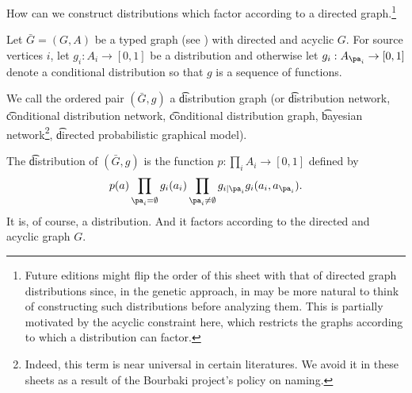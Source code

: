 

How can we construct distributions which factor according to a directed graph.\footnote{Future editions might flip the order of this sheet with that of directed graph distributions since, in the genetic approach, in may be more natural to think of constructing such distributions before analyzing them. This is partially motivated by the acyclic constraint here, which restricts the graphs according to which a distribution can factor.}


Let $\bar{G} = (G, A)$ be a typed graph (see ) with directed and acyclic $G$.
For source vertices $i$, let $g_i: A_i \to [0, 1]$ be a distribution and otherwise let $g_{i}: A_{\pa_i} \to [0, 1]$ denote a conditional distribution so that $g$ is a sequence of functions.

We call the ordered pair $(\bar{G}, g)$ a \t{distribution graph} (or \t{distribution network}, \t{conditional distribution network}, \t{conditional distribution graph}, \t{bayesian network}\footnote{Indeed, this term is near universal in certain literatures. We avoid it in these sheets as a result of the Bourbaki project's policy on naming.}, \t{directed probabilistic graphical model}).

The \t{distribution} of $(\bar{G}, g)$ is the function $p: \prod_{i} A_i \to [0, 1]$ defined by
\[
  p(a) \prod_{\pa_i = \emptyset} g_i(a_i) \prod_{\pa_i \neq \emptyset} g_{i \mid \pa_i} g_i(a_i, a_{\pa_i}).
\]
It is, of course, a distribution.
And it factors according to the directed and acyclic graph $G$.


\blankpage
